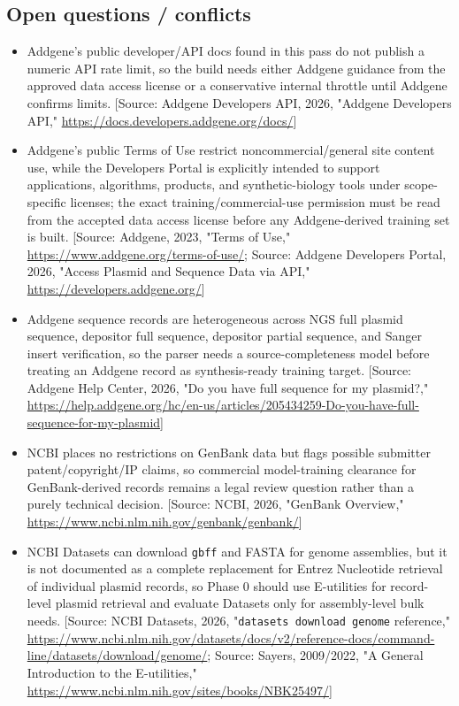 \documentclass[11pt]{report}
\begin{document}
\subsection{Open questions / conflicts}
\begin{itemize}
\item Addgene's public developer/API docs found in this pass do not publish a numeric API rate limit, so the build needs either Addgene guidance from the approved data access license or a conservative internal throttle until Addgene confirms limits. [Source: Addgene Developers API, 2026, "Addgene Developers API," \url{https://docs.developers.addgene.org/docs/}]
\item Addgene's public Terms of Use restrict noncommercial/general site content use, while the Developers Portal is explicitly intended to support applications, algorithms, products, and synthetic-biology tools under scope-specific licenses; the exact training/commercial-use permission must be read from the accepted data access license before any Addgene-derived training set is built. [Source: Addgene, 2023, "Terms of Use," \url{https://www.addgene.org/terms-of-use/}; Source: Addgene Developers Portal, 2026, "Access Plasmid and Sequence Data via API," \url{https://developers.addgene.org/}]
\item Addgene sequence records are heterogeneous across NGS full plasmid sequence, depositor full sequence, depositor partial sequence, and Sanger insert verification, so the parser needs a source-completeness model before treating an Addgene record as synthesis-ready training target. [Source: Addgene Help Center, 2026, "Do you have full sequence for my plasmid?," \url{https://help.addgene.org/hc/en-us/articles/205434259-Do-you-have-full-sequence-for-my-plasmid}]
\item NCBI places no restrictions on GenBank data but flags possible submitter patent/copyright/IP claims, so commercial model-training clearance for GenBank-derived records remains a legal review question rather than a purely technical decision. [Source: NCBI, 2026, "GenBank Overview," \url{https://www.ncbi.nlm.nih.gov/genbank/genbank/}]
\item NCBI Datasets can download \texttt{gbff} and FASTA for genome assemblies, but it is not documented as a complete replacement for Entrez Nucleotide retrieval of individual plasmid records, so Phase 0 should use E-utilities for record-level plasmid retrieval and evaluate Datasets only for assembly-level bulk needs. [Source: NCBI Datasets, 2026, "\texttt{datasets download genome} reference," \url{https://www.ncbi.nlm.nih.gov/datasets/docs/v2/reference-docs/command-line/datasets/download/genome/}; Source: Sayers, 2009/2022, "A General Introduction to the E-utilities," \url{https://www.ncbi.nlm.nih.gov/sites/books/NBK25497/}]
\end{itemize}
\end{document}
